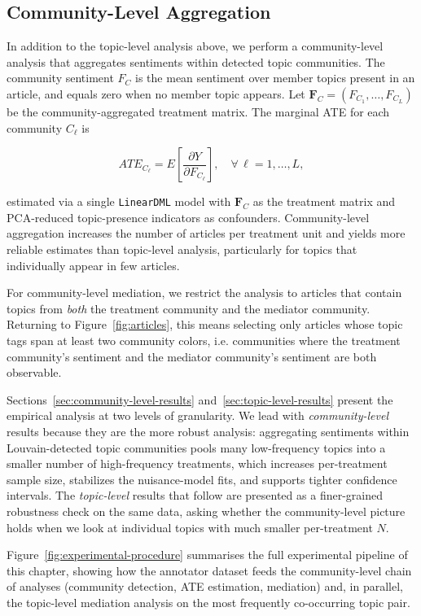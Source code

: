 \subsection{Community-Level Aggregation}
\label{sec:community-aggregation}

In addition to the topic-level analysis above, we perform a community-level analysis that aggregates sentiments within detected topic communities. The community sentiment $F_C$ is the mean sentiment over member topics present in an article, and equals zero when no member topic appears. Let $\mathbf{F}_C = (F_{C_1}, \ldots, F_{C_L})$ be the community-aggregated treatment matrix. The marginal ATE for each community $C_\ell$ is

\begin{equation}
  ATE_{C_\ell} = E\!\left[\frac{\partial Y}{\partial F_{C_\ell}}\right], \quad \forall\, \ell = 1, \ldots, L,
  \label{eq:ate_comm}
\end{equation}

\noindent estimated via a single \texttt{LinearDML} model with $\mathbf{F}_C$ as the treatment matrix and PCA-reduced topic-presence indicators as confounders. Community-level aggregation increases the number of articles per treatment unit and yields more reliable estimates than topic-level analysis, particularly for topics that individually appear in few articles.

For community-level mediation, we restrict the analysis to articles that contain topics from \emph{both} the treatment community and the mediator community. Returning to Figure~\ref{fig:articles}, this means selecting only articles whose topic tags span at least two community colors, i.e. communities where the treatment community's sentiment and the mediator community's sentiment are both observable.

Sections~\ref{sec:community-level-results} and~\ref{sec:topic-level-results} present the empirical analysis at two levels of granularity. We lead with \emph{community-level} results because they are the more robust analysis: aggregating sentiments within Louvain-detected topic communities pools many low-frequency topics into a smaller number of high-frequency treatments, which increases per-treatment sample size, stabilizes the nuisance-model fits, and supports tighter confidence intervals. The \emph{topic-level} results that follow are presented as a finer-grained robustness check on the same data, asking whether the community-level picture holds when we look at individual topics with much smaller per-treatment $N$.

Figure~\ref{fig:experimental-procedure} summarises the full experimental pipeline of this chapter, showing how the annotator dataset feeds the community-level chain of analyses (community detection, ATE estimation, mediation) and, in parallel, the topic-level mediation analysis on the most frequently co-occurring topic pair.

